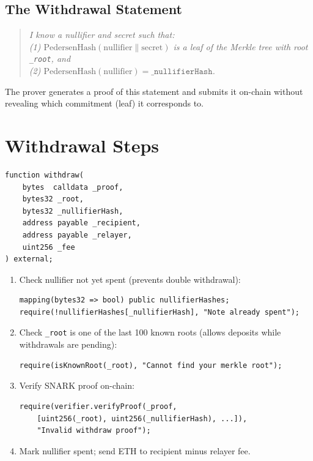\documentclass[12pt,a4paper,openany]{book}
\theoremstyle{definition}
\theoremstyle{plain}
\theoremstyle{remark}
\begin{document}
\subsection{The Withdrawal Statement}

\begin{quote}
\itshape
I know a \emph{nullifier} and \emph{secret} such that:\\
(1) $\mathrm{PedersenHash}(\text{nullifier}\|\text{secret})$ is a leaf of
the Merkle tree with root \texttt{\_root}, and\\
(2) $\mathrm{PedersenHash}(\text{nullifier}) = \texttt{\_nullifierHash}$.
\end{quote}

The prover generates a proof of this statement and submits it
on-chain without revealing which commitment (leaf) it corresponds to.

\section{Withdrawal Steps}

\begin{lstlisting}[language=Solidity,caption=withdraw() signature]
function withdraw(
    bytes  calldata _proof,
    bytes32 _root,
    bytes32 _nullifierHash,
    address payable _recipient,
    address payable _relayer,
    uint256 _fee
) external;
\end{lstlisting}

\begin{enumerate}
  \item Check nullifier not yet spent (prevents double withdrawal):
\begin{lstlisting}[language=Solidity]
mapping(bytes32 => bool) public nullifierHashes;
require(!nullifierHashes[_nullifierHash], "Note already spent");
\end{lstlisting}
  \item Check \texttt{\_root} is one of the last 100 known roots (allows
        deposits while withdrawals are pending):
\begin{lstlisting}[language=Solidity]
require(isKnownRoot(_root), "Cannot find your merkle root");
\end{lstlisting}
  \item Verify SNARK proof on-chain:
\begin{lstlisting}[language=Solidity]
require(verifier.verifyProof(_proof,
    [uint256(_root), uint256(_nullifierHash), ...]),
    "Invalid withdraw proof");
\end{lstlisting}
  \item Mark nullifier spent; send ETH to recipient minus relayer fee.
\end{enumerate}
\end{document}
